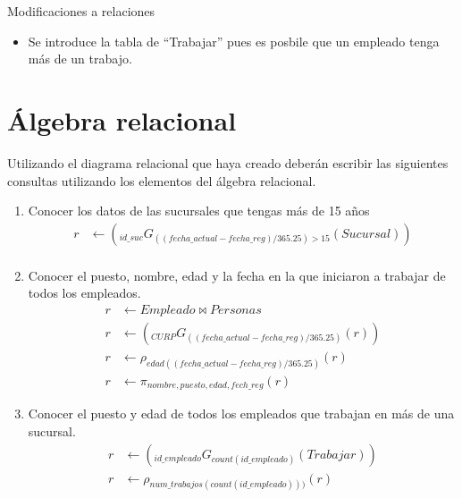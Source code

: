 \documentclass{article}
\begin{document}
    Modificaciones a relaciones
    \begin{itemize}
        \item Se introduce la tabla de ``Trabajar'' pues es posbile que un
        empleado tenga más de un trabajo.
    \end{itemize}
    
    \section{Álgebra relacional}
    Utilizando el diagrama relacional que haya creado deberán escribir las
    siguientes consultas utilizando los elementos del álgebra relacional.
    \begin{enumerate}
        \item {
            Conocer los datos de las sucursales que tengas más de 15 años
            \begin{align*}
                r &\leftarrow (_{id\_suc}G_{((fecha\_actual-fecha\_reg)/365.25) > 15}(Sucursal)) \\
            \end{align*}
        }
        \item {
            Conocer el puesto, nombre, edad y la fecha en la que iniciaron a
            trabajar de todos los empleados.
            \begin{align*}
                r &\leftarrow Empleado \bowtie Personas \\
                r &\leftarrow (_{CURP}G_{((fecha\_actual-fecha\_reg)/365.25)}(r))\\
                r &\leftarrow \rho_{edad((fecha\_actual-fecha\_reg)/365.25)}(r) \\
                r &\leftarrow \pi_{nombre, puesto, edad, fech\_reg}(r)
            \end{align*}
        }
        \item {
            Conocer el puesto y edad de todos los empleados que trabajan en más 
            de una sucursal.
            \begin{align*}
                r &\leftarrow (_{id\_empleado}G_{count(id\_empleado)}(Trabajar)) \\
                r &\leftarrow \rho_{num\_trabajos(count(id\_empleado)))}(r)\\

\end{align*}}
\end{enumerate}
\end{document}
